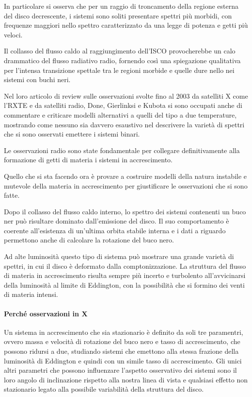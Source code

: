 \documentclass[a4paperbi]{article}
\begin{document}
	In particolare si osserva che per un raggio di troncamento della regione esterna del disco decrescente, i sistemi sono soliti presentare spettri più morbidi, con frequenze maggiori nello spettro caratterizzato da una legge di potenza e getti più veloci.
	
	Il collasso del flusso caldo al raggiungimento dell'ISCO provocherebbe un calo drammatico del flusso radiativo radio, fornendo così una spiegazione qualitativa per l'intensa transizione spettale tra le regioni morbide e quelle dure nello nei sistemi con buchi neri.
	
	Nel loro articolo di review sulle osservazioni svolte fino al 2003 da satelliti X come l'RXTE e da satelliti radio, Done, Gierlinksi e Kubota si sono occupati anche di commentare e criticare modelli alternativi a quelli del tipo a due temperature, mostrando come nessuno sia davvero esaustivo nel descrivere la varietà di spettri che si sono osservati emettere i sistemi binari.
	
	Le osservazioni radio sono state fondamentale per collegare definitivamente alla formazione di getti di materia i sistemi in accrescimento.
	
	Quello che si sta facendo ora è provare a costruire modelli della natura instabile e mutevole della materia in accrescimento per giustificare le osservazioni che si sono fatte.	
	
	Dopo il collasso del flusso caldo interno, lo spettro dei sistemi contenenti un buco ner può risultare dominato dall'emissione del disco. Il suo comportamento è coerente all'esistenza di un'ultima orbita stabile interna e i dati a riguardo permettono anche di calcolare la rotazione del buco nero.
	
	Ad alte luminosità questo tipo di sistema può mostrare una grande varietà di spettri, in cui il disco è deformato dalla comptonizzazione. La struttura del flusso di materia in accrescimento risulta sempre più incerto e turbolento all'avvicinarsi della luminosità al limite di Eddington, con la possibilità che si formino dei venti di materia intensi.
	
	\paragraph{Perché osservazioni in X}
	Un sistema in accrescimento che sia stazionario è definito da soli tre paramentri, ovvero massa e velocità di rotazione del buco nero e tasso di accrescimento, che possono ridursi a due, studiando sistemi che emettono alla stessa frazione della luminosità di Eddington e quindi con un simile tasso di accrescimento. Gli unici altri parametri che possono influenzare l'aspetto osservativo dei sistemi sono il loro angolo di inclinazione rispetto alla nostra linea di vista e qualsiasi effetto non stazionario legato alla possibile variabilità della struttura del disco.
	
\end{document}
